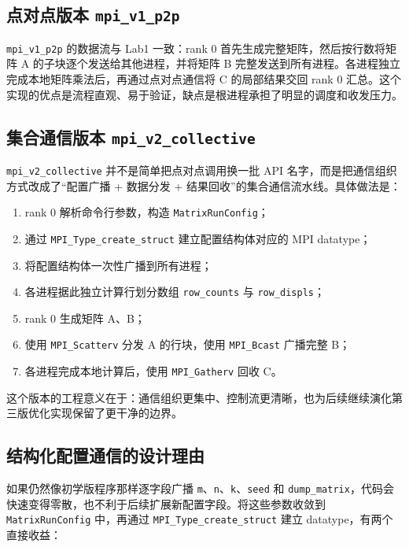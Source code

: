 \documentclass[UTF8,a4paper,12pt,fontset=none]{ctexart}
\begin{document}
\subsection{点对点版本 \texttt{mpi\_v1\_p2p}}

\texttt{mpi\_v1\_p2p} 的数据流与 Lab1 一致：rank 0 首先生成完整矩阵，然后按行数将矩阵 A 的子块逐个发送给其他进程，并将矩阵 B 完整发送到所有进程。各进程独立完成本地矩阵乘法后，再通过点对点通信将 C 的局部结果交回 rank 0 汇总。这个实现的优点是流程直观、易于验证，缺点是根进程承担了明显的调度和收发压力。

\subsection{集合通信版本 \texttt{mpi\_v2\_collective}}

\texttt{mpi\_v2\_collective} 并不是简单把点对点调用换一批 API 名字，而是把通信组织方式改成了“配置广播 + 数据分发 + 结果回收”的集合通信流水线。具体做法是：

\begin{enumerate}[leftmargin=2.2em]
  \item rank 0 解析命令行参数，构造 \texttt{MatrixRunConfig}；
  \item 通过 \texttt{MPI\_Type\_create\_struct} 建立配置结构体对应的 MPI datatype；
  \item 将配置结构体一次性广播到所有进程；
  \item 各进程据此独立计算行划分数组 \texttt{row\_counts} 与 \texttt{row\_displs}；
  \item rank 0 生成矩阵 A、B；
  \item 使用 \texttt{MPI\_Scatterv} 分发 A 的行块，使用 \texttt{MPI\_Bcast} 广播完整 B；
  \item 各进程完成本地计算后，使用 \texttt{MPI\_Gatherv} 回收 C。
\end{enumerate}

这个版本的工程意义在于：通信组织更集中、控制流更清晰，也为后续继续演化第三版优化实现保留了更干净的边界。

\subsection{结构化配置通信的设计理由}

如果仍然像初学版程序那样逐字段广播 \texttt{m}、\texttt{n}、\texttt{k}、\texttt{seed} 和 \texttt{dump\_matrix}，代码会快速变得零散，也不利于后续扩展新配置字段。将这些参数收敛到 \texttt{MatrixRunConfig} 中，再通过 \texttt{MPI\_Type\_create\_struct} 建立 datatype，有两个直接收益：
\end{document}
